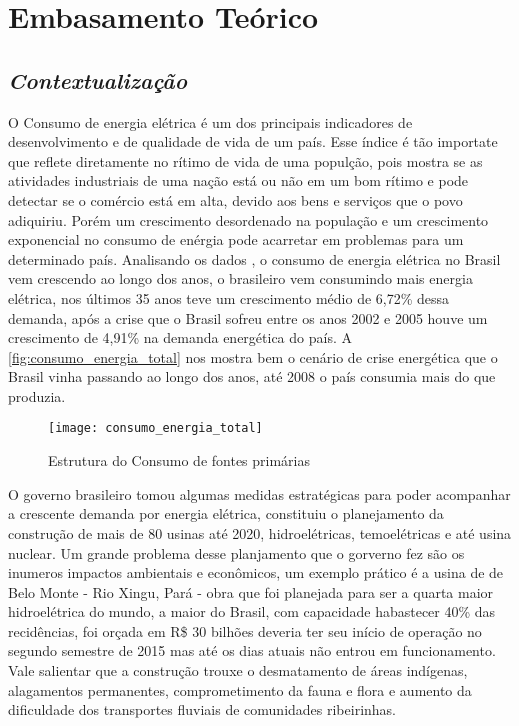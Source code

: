 \chapter[Embasamento Teórico]{Embasamento Teórico}
\label{ch:cap2}
\section[\textit{Contextualizacao}]{\textit{Contextualização}}\label{context}
O Consumo de energia elétrica é um dos principais indicadores de desenvolvimento e de qualidade de vida 
de um país. Esse índice é tão importate que reflete diretamente no rítimo de vida de uma populção, pois mostra
se as atividades industriais de uma nação está ou não em um bom rítimo e pode detectar se o comércio está em alta,
devido aos bens e serviços que o povo adiquiriu. Porém um crescimento desordenado na população e um crescimento
exponencial no consumo de enérgia pode acarretar em problemas para um determinado país.
Analisando os dados \cite{epe-balanco-final}, o consumo de energia
elétrica no Brasil vem crescendo ao longo dos anos, o brasileiro vem consumindo mais energia elétrica, nos últimos
35 anos teve um crescimento médio de 6,72\% dessa demanda, após a crise que o Brasil sofreu entre os anos 2002 e 2005 houve um crescimento
de 4,91\% na demanda energética do país. A \autoref{fig:consumo_energia_total} nos mostra bem o cenário de crise energética que o Brasil vinha
passando ao longo dos anos, até 2008 o país consumia mais do que produzia.

\begin{figure}[h!]
	\texttt{[image: consumo\_energia\_total]}
	\centering
	\caption[Estrutura do Consumo de fontes primárias]{Estrutura do Consumo de fontes primárias}
	\label{fig:consumo_energia_total}
\end{figure}
\FloatBarrier

O governo brasileiro tomou algumas medidas estratégicas para poder acompanhar a crescente demanda por energia elétrica, constituiu o planejamento
da construção de mais de 80 usinas até 2020, hidroelétricas, temoelétricas e até usina nuclear. Um grande problema desse planjamento que o gorverno
fez são os inumeros impactos ambientais e econômicos, um exemplo prático é a usina de de Belo Monte - Rio Xingu, Pará - obra que foi planejada
para ser a quarta maior hidroelétrica do mundo, a maior do Brasil, com capacidade habastecer 40\% das recidências, foi orçada em R\$ 30 bilhões
deveria ter seu início de operação no segundo semestre de 2015 mas até os dias atuais não entrou em funcionamento. Vale salientar que a construção
trouxe o desmatamento de áreas indígenas, alagamentos permanentes, comprometimento da fauna e flora e aumento da dificuldade dos transportes fluviais
de comunidades ribeirinhas.

